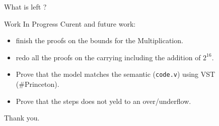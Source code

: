 \documentclass[8pt]{beamer}
\begin{document}
\begin{frame}[standout]
  \Huge What is left ?
\end{frame}

\begin{frame}[fragile]{Work In Progress}
    Curent and future work:
    \begin{itemize}
      \item finish the proofs on the bounds for the Multiplication.
      \item redo all the proofs on the carrying including the addition of $2^{16}$.
      \item Prove that the model matches the semantic (\texttt{code.v}) using VST (\#Princeton).
      \item Prove that the steps does not yeld to an over/underflow.
    \end{itemize}
\end{frame}





%
%
\begin{frame}[standout]
	\Huge Thank you.
\end{frame}
\end{document}
